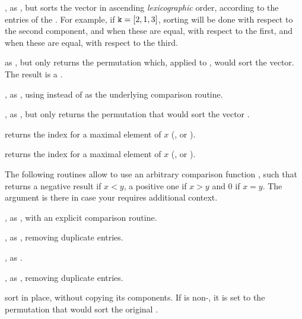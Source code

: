 , as , but sorts the
vector  in ascending \emph{lexicographic} order, according to the
entries of the  . For example,  if ${\tt k} = [2,1,3]$,
sorting will be done with respect to the second component,  and when these
are  equal, with respect to the first,  and when these are equal,  with
respect to the third.


 as , but only returns the permutation
which, applied to , would sort the vector. The result is a
.

, as , using 
instead of  as the underlying comparison routine.

, as , but only
returns the permutation that would sort the vector .

 returns the index for a maximal element of $x$
(,  or ).

 returns the index for a maximal element of $x$
(,  or ).


 The following routines allow to use an
arbitrary comparison function ,
such that  returns a negative result if $x
< y$, a positive one if $x > y$ and 0 if $x = y$. The  argument is
there in case your  requires additional context.

, as
, with an explicit comparison routine.

, as
, removing duplicate entries.

,
as .

,
as , removing duplicate entries.

 sort  in place, without copying its components. If
 is non-, it is set to the permutation that would sort
the original .

